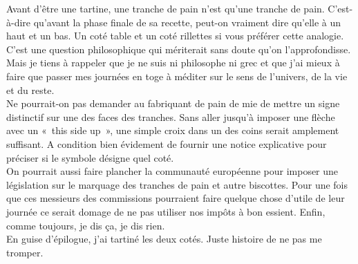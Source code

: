 Avant d’être une tartine, une tranche de pain n’est qu’une tranche de pain. C’est-à-dire qu’avant la phase finale de sa recette, peut-on vraiment dire qu’elle à un haut et un bas. Un coté table et un coté rillettes si vous préférer cette analogie. C’est une question philosophique qui mériterait sans doute qu’on l’approfondisse. Mais je tiens à rappeler que je ne suis ni philosophe ni grec et que j’ai mieux à faire que passer mes journées en toge à méditer sur le sens de l’univers, de la vie et du reste.\\

Ne pourrait-on pas demander au fabriquant de pain de mie de mettre un signe distinctif sur une des faces des tranches. Sans aller jusqu’à imposer une flèche avec un « this side up », une simple croix dans un des coins serait amplement suffisant. A condition bien évidement de fournir une notice explicative pour préciser si le symbole désigne quel coté.\\
On pourrait aussi faire plancher la communauté européenne pour imposer une législation sur le marquage des tranches de pain et autre biscottes. Pour une fois que ces messieurs des commissions pourraient faire quelque chose d'utile de leur journée ce serait domage de ne pas utiliser nos impôts à bon essient. Enfin, comme toujours, je dis ça, je dis rien.\\

En guise d’épilogue, j’ai tartiné les deux cotés. Juste histoire de ne pas me tromper.
